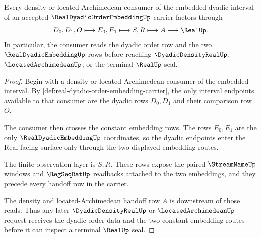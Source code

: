 \begin{theorem}
\label{thm:real-dyadic-order-embedding-density-handoff}
Every density or located-Archimedean consumer of the embedded dyadic interval of an accepted $\RealDyadicOrderEmbeddingUp$ carrier factors through
$$
D_0,D_1,O \longmapsto E_0,E_1 \longmapsto S,R \longmapsto A \longmapsto \RealUp .
$$
In particular, the consumer reads the dyadic order row and the two $\RealDyadicEmbeddingUp$ rows before reaching $\DyadicDensityRealUp$, $\LocatedArchimedeanUp$, or the terminal $\RealUp$ seal.
\end{theorem}
\begin{proof}
Begin with a density or located-Archimedean consumer of the embedded interval. By \autoref{def:real-dyadic-order-embedding-carrier}, the only interval endpoints available to that consumer are the dyadic rows $D_0,D_1$ and their comparison row $O$.

The consumer then crosses the constant embedding rows. The rows $E_0,E_1$ are the only $\RealDyadicEmbeddingUp$ coordinates, so the dyadic endpoints enter the Real-facing surface only through the two displayed embedding routes.

The finite observation layer is $S,R$. These rows expose the paired $\StreamNameUp$ windows and $\RegSeqRatUp$ readbacks attached to the two embeddings, and they precede every handoff row in the carrier.

The density and located-Archimedean handoff row $A$ is downstream of those reads. Thus any later $\DyadicDensityRealUp$ or $\LocatedArchimedeanUp$ request receives the dyadic order data and the two constant embedding routes before it can inspect a terminal $\RealUp$ seal.
\end{proof}


\begin{closurestatus}{\RealDyadicOrderEmbeddingUp}
  \theoryclosure{\seedClosure}
  \formalstatus{\unformalizedV}
\end{closurestatus}
